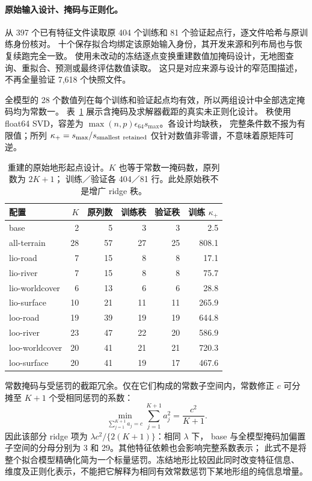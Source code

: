 \documentclass[UTF8,11pt]{ctexart}
\begin{document}
\paragraph{原始输入设计、掩码与正则化。}
从 397 个已有特征文件读取原 404 个训练和 81 个验证起点行，逐文件哈希与原训练身份核对。
十个保存拟合均绑定该原始输入身份，其开发来源和列布局也与恢复续跑完全一致。
使用未改动的冻结逐点变换重建数值加掩码设计，无地图查询、重拟合、预测或最终评估数值读取。
这只是对应来源与设计的窄范围描述，不再全量验证 7,618 个快照文件。

全模型的 28 个数值列在每个训练和验证起点均有效，所以两组设计中全部选定掩码均为常数一。
表~\ref{tab:raw-terrain-design} 展示含掩码及求解器截距的真实未正则化设计。
秩使用 float64 SVD，容差为 \(\max(n,p)\epsilon_{64}s_{\max}\)。各设计均缺秩，
完整条件数不报为有限值；所列 \(\kappa_{+}=s_{\max}/s_{\rm smallest\ retained}\)
仅针对数值非零谱，不意味着原矩阵可逆。

\begin{table}[htbp]
\centering\small
\caption{重建的原始地形起点设计。\(K\) 也等于常数一掩码数，原列数为 \(2K+1\)；
训练／验证各 404／81 行。此处原始秩不是增广 ridge 秩。}
\label{tab:raw-terrain-design}
\begin{tabular}{lrrrrr}
\toprule
配置 & \(K\) & 原列数 & 训练秩 & 验证秩 & 训练 \(\kappa_{+}\)\\
\midrule
base & 2 & 5 & 3 & 3 & 2.5\\
all-terrain & 28 & 57 & 27 & 25 & 808.1\\
lio-road & 7 & 15 & 8 & 8 & 17.1\\
lio-river & 7 & 15 & 8 & 8 & 75.7\\
lio-worldcover & 6 & 13 & 6 & 6 & 28.8\\
lio-surface & 10 & 21 & 11 & 11 & 265.9\\
loo-road & 19 & 39 & 19 & 19 & 644.8\\
loo-river & 23 & 47 & 22 & 20 & 586.9\\
loo-worldcover & 20 & 41 & 21 & 21 & 720.3\\
loo-surface & 20 & 41 & 19 & 17 & 467.6\\
\bottomrule
\end{tabular}
\end{table}

常数掩码与受惩罚的截距冗余。仅在它们构成的常数子空间内，常数修正 \(c\)
可分摊至 \(K+1\) 个受相同惩罚的系数：
\begin{equation}
\min_{\sum_{j=1}^{K+1}a_j=c}\sum_{j=1}^{K+1}a_j^2=\frac{c^2}{K+1}.
\label{eq:constant-mask-penalty}
\end{equation}
因此该部分 ridge 项为 \(\lambda c^2/\{2(K+1)\}\)：相同 \(\lambda\) 下，
base 与全模型掩码加偏置子空间的分母分别为 3 和 29。其他特征依赖也会影响完整系数表示；
此式不是将整个拟合模型精确化简为一个标量惩罚。冻结地形比较因此同时改变特征信息、
维度及正则化表示，不能把它解释为相同有效常数惩罚下某地形组的纯信息增量。
\end{document}
